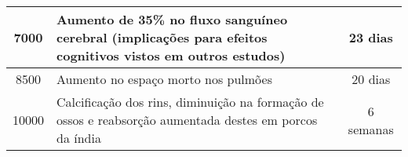 \documentclass[12pt,a4paper]{article}
\begin{document}
\begin{longtable}{cp{8.5cm}c}
	\SI{7000}{\ppm}                                                        & {Aumento de 35\% no fluxo sanguíneo cerebral
	(implicações para efeitos cognitivos vistos em outros estudos)}        & 23 dias                                                                                                    \\ \midrule
	\SI{8500}{\ppm}                                                        & {Aumento no espaço morto nos pulmões}                             & 20 dias                                \\ \midrule
	\SI{10000}{\ppm}                                                       & {Calcificação dos rins, diminuição na formação de ossos e
	reabsorção aumentada destes em porcos da índia}                        & 6 semanas                                                                                                  \\ \bottomrule
\end{longtable}
\end{document}
